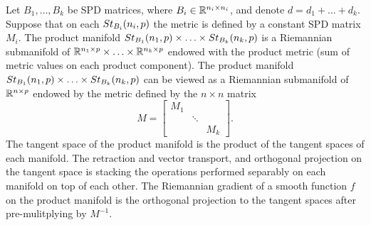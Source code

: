 \documentclass[11pt,a4paper]{article}
\begin{document}
\begin{proposition}
Let $B_1,\ldots,B_k$ be SPD matrices, where $B_i\in\mathbb{R}^{n_i\times n_i}$, and denote $d = d_1+\ldots+d_k$. Suppose that on each $St_{B_{i}}(n_{i},p)$ the metric is defined by a constant SPD matrix $M_i$. The product manifold $St_{B_{1}}(n_{1},p)\times\ldots\times St_{B_{k}}(n_{k},p)$ is a Riemannian submanifold of $\mathbb{R}^{n_1\times p}\times\ldots\times\mathbb{R}^{n_k\times p}$ endowed with the product metric (sum of metric values on each product component). The product manifold $St_{B_{1}}(n_{1},p)\times\ldots\times St_{B_{k}}(n_{k},p)$ can be viewed as a Riemannian submanifold of $\mathbb{R}^{n\times p}$ endowed by the metric defined by the $n\times n$ matrix
\begin{equation*}
M = 
\left[\begin{array}{ccc}
M_1 & & \\
 & \ddots & \\
 & & M_k
\end{array}\right].
\end{equation*}
The tangent space of the product manifold is the product of the tangent spaces of each manifold. The retraction and vector transport, and orthogonal projection on the tangent space is stacking the operations performed separably on each manifold on top of each other. The Riemannian gradient of a smooth function $f$ on the product manifold is the orthogonal projection to the tangent spaces after pre-mulitplying by $M^{-1}$.
\end{proposition}

\end{document}
